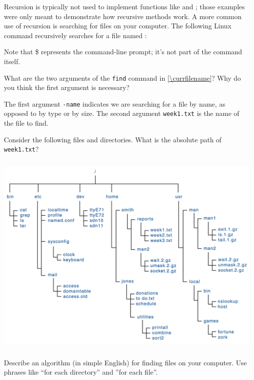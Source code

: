 
Recursion is typically not used to implement functions like  and ; those examples were only meant to demonstrate how recursive methods work.
A more common use of recursion is searching for files on your computer.
The following Linux command recursively searches for a file named :

\vspace{1em}
\vspace{1em}

Note that \$ represents the command-line prompt; it's not part of the command itself.




\Q What are the two arguments of the \texttt{find} command in \ref{\currfilename}?
Why do you think the first argument is necessary?

\begin{answer}
The first argument \texttt{-name} indicates we are searching for a file by name, as opposed to by type or by size. The second argument \texttt{week1.txt} is the name of the file to find.
\end{answer}


\Q Consider the following files and directories.
What is the absolute path of \texttt{week1.txt}?

\begin{center}
\includegraphics[height=4in]{files-unix.png}
\end{center}


\Q Describe an algorithm (in simple English) for finding files on your computer.
Use phrases like ``for each directory'' and ''for each file''.

